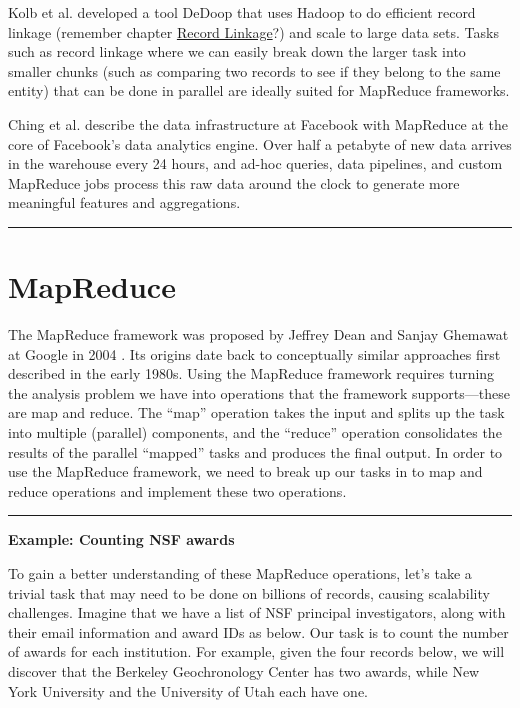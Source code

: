 \documentclass[]{krantz}
\begin{document}
Kolb et al. \citeyearpar{kolb2012} developed a tool DeDoop that uses
Hadoop to do efficient record linkage (remember chapter
\protect\hyperlink{chap:link}{Record Linkage}?) and scale to large data
sets. Tasks such as record linkage where we can easily break down the
larger task into smaller chunks (such as comparing two records to see if
they belong to the same entity) that can be done in parallel are ideally
suited for MapReduce frameworks.

Ching et al. \citeyearpar{ching2012} describe the data infrastructure at
Facebook with MapReduce at the core of Facebook's data analytics engine.
Over half a petabyte of new data arrives in the warehouse every 24
hours, and ad-hoc queries, data pipelines, and custom MapReduce jobs
process this raw data around the clock to generate more meaningful
features and aggregations.

\begin{center}\rule{0.5\linewidth}{\linethickness}\end{center}

\section{MapReduce}\label{mapreduce}

The MapReduce framework was proposed by Jeffrey Dean and Sanjay Ghemawat
at Google in 2004 \citep{MapReduce}. Its origins date back to
conceptually similar approaches first described in the early 1980s.
Using the MapReduce framework requires turning the analysis problem we
have into operations that the framework supports---these are map and
reduce. The ``map'' operation takes the input and splits up the task
into multiple (parallel) components, and the ``reduce'' operation
consolidates the results of the parallel ``mapped'' tasks and produces
the final output. In order to use the MapReduce framework, we need to
break up our tasks in to map and reduce operations and implement these
two operations.

\begin{center}\rule{0.5\linewidth}{\linethickness}\end{center}

\textbf{Example: Counting NSF awards}

To gain a better understanding of these MapReduce operations, let's take
a trivial task that may need to be done on billions of records, causing
scalability challenges. Imagine that we have a list of NSF principal
investigators, along with their email information and award IDs as
below. Our task is to count the number of awards for each institution.
For example, given the four records below, we will discover that the
Berkeley Geochronology Center has two awards, while New York University
and the University of Utah each have one.
\end{document}
